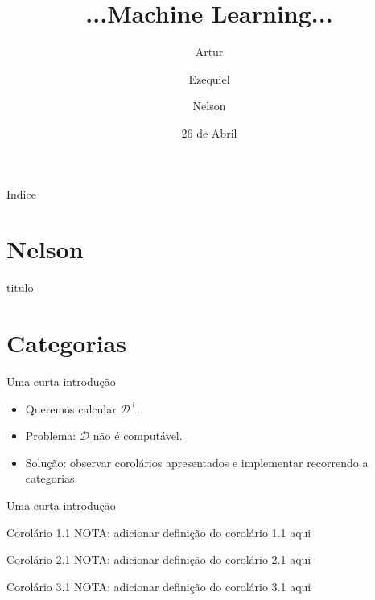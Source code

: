 \documentclass{beamer}
\title
{...Machine Learning...}
\author[Artur, Ezequiel, Nelson] 
{Artur \and Ezequiel \and Nelson}
\institute
{Universidade do Minho}
\date{26 de Abril}
\begin{document}
\begin{frame}
  \titlepage
\end{frame}

\begin{frame}{Indice}
  \tableofcontents
\end{frame}


\section{Nelson}

\begin{frame}{titulo}
\end{frame}





\section{Categorias}

\begin{frame}{Uma curta introdução}
\begin{itemize}
 \item<1-> Queremos calcular $\mathcal{D}^{+}$.
 \item<2-> Problema: $\mathcal{D}$ não é computável.
 \item<3-> Solução: observar corolários apresentados e implementar recorrendo a categorias.
\end{itemize}

\end{frame}



\begin{frame}{Uma curta introdução}

    \begin{block}{Corolário 1.1}
    NOTA: adicionar definição do corolário 1.1 aqui
    \end{block}
    
    \begin{block}{Corolário 2.1}
    NOTA: adicionar definição do corolário 2.1 aqui
    \end{block}
    
    \begin{block}{Corolário 3.1}
    NOTA: adicionar definição do corolário 3.1 aqui
    \end{block}
 
\end{frame}
\end{document}
